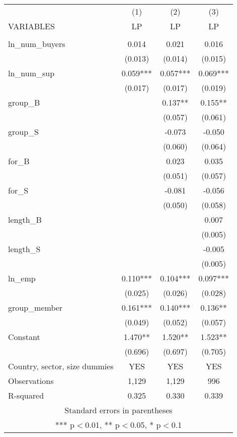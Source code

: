 
\begin{tabular}{lccc} \hline
 & (1) & (2) & (3) \\
VARIABLES & LP & LP & LP \\ \hline
 &  &  &  \\
ln\_num\_buyers & 0.014 & 0.021 & 0.016 \\
 & (0.013) & (0.014) & (0.015) \\
ln\_num\_sup & 0.059*** & 0.057*** & 0.069*** \\
 & (0.017) & (0.017) & (0.019) \\
group\_B &  & 0.137** & 0.155** \\
 &  & (0.057) & (0.061) \\
group\_S &  & -0.073 & -0.050 \\
 &  & (0.060) & (0.064) \\
for\_B &  & 0.023 & 0.035 \\
 &  & (0.051) & (0.057) \\
for\_S &  & -0.081 & -0.056 \\
 &  & (0.050) & (0.058) \\
length\_B &  &  & 0.007 \\
 &  &  & (0.005) \\
length\_S &  &  & -0.005 \\
 &  &  & (0.005) \\
ln\_emp & 0.110*** & 0.104*** & 0.097*** \\
 & (0.025) & (0.026) & (0.028) \\
group\_member & 0.161*** & 0.140*** & 0.136** \\
 & (0.049) & (0.052) & (0.057) \\
Constant & 1.470** & 1.520** & 1.523** \\
 & (0.696) & (0.697) & (0.705) \\\hline
Country, sector, size dummies &YES &YES &YES\\
Observations & 1,129 & 1,129 & 996 \\
 R-squared & 0.325 & 0.330 & 0.339 \\ \hline
\multicolumn{4}{c}{ Standard errors in parentheses} \\
\multicolumn{4}{c}{ *** p$<$0.01, ** p$<$0.05, * p$<$0.1} \\
\end{tabular}

